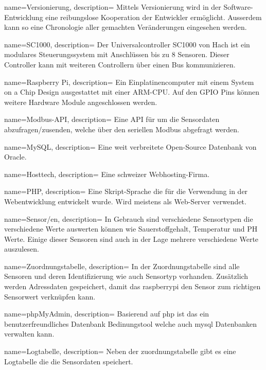 {
	name=Versionierung,
	description={
		Mittels Versionierung wird in der Software-Entwicklung eine reibungslose Kooperation der Entwickler ermöglicht. Ausserdem kann so eine Chronologie aller gemachten Veränderungen eingesehen werden.
	}
}

{
	name=SC1000,
	description={
		Der Universalcontroller SC1000 von Hach ist ein modulares Steuerungssystem mit Anschlüssen bis zu 8 Sensoren. Dieser Controller kann mit weiteren Controllern über einen Bus kommunizieren.
	}
}

{
	name=Raspberry Pi,
	description={
		Ein Einplatinencomputer mit einem System on a Chip Design ausgestattet mit einer ARM-CPU. Auf den GPIO Pins können weitere Hardware Module angeschlossen werden.
	}
}

{
	name=Modbus-API,
	description={
		Eine API für um die Sensordaten abzufragen/zusenden, welche über den seriellen Modbus abgefragt werden.
	}
}

{
	name=MySQL,
	description={
		Eine weit verbreitete Open-Source Datenbank von Oracle.
	}
}

{
	name=Hosttech,
	description={
		Eine schweizer Webhosting-Firma.
	}
}

{
	name=PHP,
	description={
		Eine Skript-Sprache die für die Verwendung in der Webentwicklung entwickelt wurde. Wird meistens als Web-Server verwendet.
	}
}

{
	name=Sensor/en,
	description={
		In Gebrauch sind verschiedene Sensortypen die verschiedene Werte auswerten können wie Sauerstoffgehalt, Temperatur und PH Werte. Einige dieser Sensoren sind auch in der Lage mehrere verschiedene Werte auszulesen.
	}
}

{
	name=Zuordnungstabelle,
	description={
		In der Zuordnungstabelle sind alle Sensoren und deren Identifizierung wie auch Sensortyp vorhanden. Zusätzlich werden Adressdaten gespeichert, damit das \gls{raspberrypi} den Sensor zum richtigen Sensorwert verknüpfen kann.
	}
}

{
	name=phpMyAdmin,
	description={
		Basierend auf \gls{php} ist das ein benutzerfreundliches Datenbank Bedinungstool welche auch \gls{mysql} Datenbanken verwalten kann.
	}
}

{
	name=Logtabelle,
	description={
		Neben der \gls{zuordnungstabelle} gibt es eine Logtabelle die die Sensordaten speichert.
	}
}

